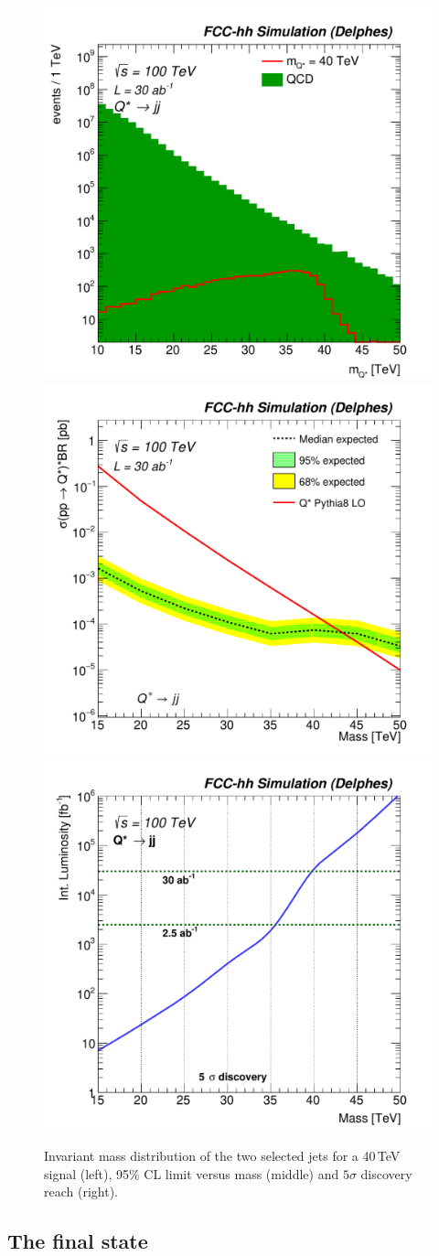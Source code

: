 \begin{figure}[!htb]
  \centering
  \includegraphics[width=0.32\columnwidth]{Fig/Mj1j2_pf04_sel1_nostack_log-eps-converted-to.pdf}
  \includegraphics[width=0.32\columnwidth]{Fig/lim_Qstar_jj_fcc_v02-eps-converted-to.pdf}
  \includegraphics[width=0.32\columnwidth]{Fig/DiscoveryPotential_jj_rootStyle-eps-converted-to.pdf}
   \caption{Invariant mass distribution of the two selected jets for a 40\,TeV signal (left), 95\% CL limit versus mass (middle) and $5\sigma$ discovery reach (right).}
  \label{figure:hadronicresonances:jj}
\end{figure}

\subsection{The \texorpdfstring{\ttbar}{tt} final state}
\label{sec:hadtt}

